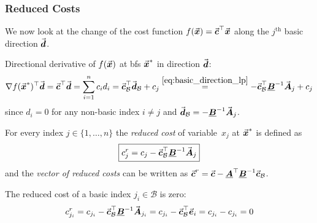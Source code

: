 \subsubsection{Reduced Costs}\label{subsec:reduced_costs_lp}

We now look at the change of the cost function \(f(\vec{\boldsymbol{x}})=\vec{\boldsymbol{c}}^{\top}\vec{\boldsymbol{x}}\) along the \(j^\text{th}\) basic direction \(\vec{\boldsymbol{d}}\).

Directional derivative of \(f(\vec{\boldsymbol{x}})\) at \gls{bfs} \(\vec{\boldsymbol{x}}^\ast\) in direction \(\vec{\boldsymbol{d}}\):
\begin{equation}\label{eq:directional_derivative_lp}
\nabla f(\vec{\boldsymbol{x}}^\ast)^{\top}\vec{\boldsymbol{d}} = \vec{\boldsymbol{c}}^{\top}\vec{\boldsymbol{d}} = \sum_{i=1}^{n} c_i d_i 
= \vec{\boldsymbol{c}}_\mathcal{B}^{\top}\vec{\boldsymbol{d}}_\mathcal{B} + c_j
\overset{\eqref{eq:basic_direction_lp}}{=}
-\vec{\boldsymbol{c}}_\mathcal{B}^{\top}\underline{\boldsymbol{B}}^{-1}\vec{\boldsymbol{A}}_j + c_j
\end{equation}
since \(d_i = 0\) for any non-basic index \(i\neq j\) and \(\vec{\boldsymbol{d}}_\mathcal{B} = -\underline{\boldsymbol{B}}^{-1}\vec{\boldsymbol{A}}_j\).

\begin{definition}\label{def:reduced_cost}
For every index \(j\in\{1,\dots,n\}\) the \emph{reduced cost} of variable~\(x_j\) at \(\vec{\boldsymbol{x}}^\ast\) is defined as
\begin{equation}\label{eq:reduced_cost}
\boxed{
c^r_j
=
c_j-\vec{\boldsymbol{c}}_\mathcal{B}^{\top}\underline{\boldsymbol{B}}^{-1}\vec{\boldsymbol{A}}_j
}
\end{equation}
and the \emph{vector of reduced costs} can be written as
\(
\vec{\boldsymbol{c}}^r
=
\vec{\boldsymbol{c}}-\underline{\boldsymbol{A}}^{\top}\underline{\boldsymbol{B}}^{-1}\vec{\boldsymbol{c}}_\mathcal{B}
\).
\end{definition}

The reduced cost of a basic index \(j_i \in \mathcal{B}\) is zero:
\begin{equation}\label{eq:reduced_cost_basic_index}
c^r_{j_i} = c_{j_i} - \vec{\boldsymbol{c}}_\mathcal{B}^{\top}\underline{\boldsymbol{B}}^{-1}\vec{\boldsymbol{A}}_{j_i}
= c_{j_i} - \vec{\boldsymbol{c}}_\mathcal{B}^{\top}\vec{\boldsymbol{e}}_i
= c_{j_i} - c_{j_i} = 0
\end{equation}





